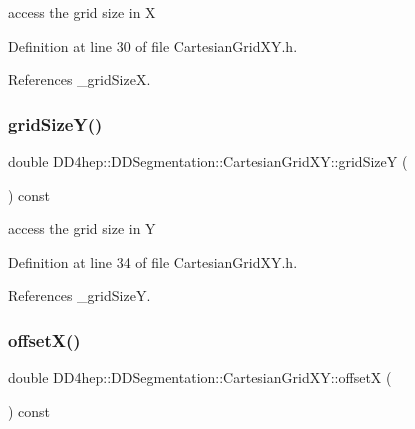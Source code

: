 access the grid size in X 



Definition at line 30 of file Cartesian\+Grid\+X\+Y.\+h.



References \+\_\+grid\+SizeX.

\hypertarget{class_d_d4hep_1_1_d_d_segmentation_1_1_cartesian_grid_x_y_a353429c8e77567e6bb5b84aae1c9d130}{}\label{class_d_d4hep_1_1_d_d_segmentation_1_1_cartesian_grid_x_y_a353429c8e77567e6bb5b84aae1c9d130} 
\subsubsection{\texorpdfstring{grid\+Size\+Y()}{gridSizeY()}}
{\footnotesize\ttfamily double D\+D4hep\+::\+D\+D\+Segmentation\+::\+Cartesian\+Grid\+X\+Y\+::grid\+SizeY (\begin{DoxyParamCaption}{ }\end{DoxyParamCaption}) const\hspace{0.3cm}{\ttfamily [inline]}}



access the grid size in Y 



Definition at line 34 of file Cartesian\+Grid\+X\+Y.\+h.



References \+\_\+grid\+SizeY.

\hypertarget{class_d_d4hep_1_1_d_d_segmentation_1_1_cartesian_grid_x_y_aef74e4a110f5105ec530912c3f88ebe9}{}\label{class_d_d4hep_1_1_d_d_segmentation_1_1_cartesian_grid_x_y_aef74e4a110f5105ec530912c3f88ebe9} 
\subsubsection{\texorpdfstring{offset\+X()}{offsetX()}}
{\footnotesize\ttfamily double D\+D4hep\+::\+D\+D\+Segmentation\+::\+Cartesian\+Grid\+X\+Y\+::offsetX (\begin{DoxyParamCaption}{ }\end{DoxyParamCaption}) const\hspace{0.3cm}{\ttfamily [inline]}}



